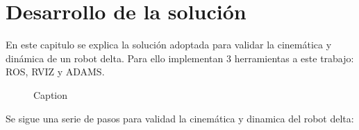 \chapter{Desarrollo de la solución}\label{CAP6}
    
    
    En este capitulo se explica la solución adoptada para validar la cinemática y dinámica de un robot delta. Para ello implementan 3 herramientas a este trabajo: ROS, RVIZ y ADAMS. 
    
    \begin{figure}[h]
        \centering
        \caption{Caption}
        \label{fig:cap6_intro_1}
    \end{figure}

    Se sigue una serie de pasos para validad la cinemática y dinamica del robot delta:
    
